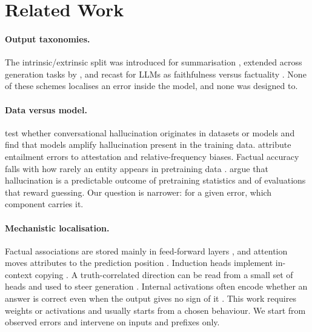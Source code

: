\documentclass[10pt]{article}
\begin{document}
\section{Related Work}
\label{sec:related}

\paragraph{Output taxonomies.} The intrinsic/extrinsic split was introduced for summarisation \citep{maynez2020}, extended across generation tasks by \citet{ji2023}, and recast for LLMs as faithfulness versus factuality \citep{huang2023,alansari2025}. None of these schemes localises an error inside the model, and none was designed to.

\paragraph{Data versus model.} \citet{dziri2022} test whether conversational hallucination originates in datasets or models and find that models amplify hallucination present in the training data. \citet{mckenna2023} attribute entailment errors to attestation and relative-frequency biases. Factual accuracy falls with how rarely an entity appears in pretraining data \citep{kandpal2023,mallen2023}. \citet{kalai2025} argue that hallucination is a predictable outcome of pretraining statistics and of evaluations that reward guessing. Our question is narrower: for a given error, which component carries it.

\paragraph{Mechanistic localisation.} Factual associations are stored mainly in feed-forward layers \citep{geva2021,meng2022}, and attention moves attributes to the prediction position \citep{geva2023}. Induction heads implement in-context copying \citep{olsson2022}. A truth-correlated direction can be read from a small set of heads and used to steer generation \citep{li2023iti}. Internal activations often encode whether an answer is correct even when the output gives no sign of it \citep{kadavath2022,azaria2023,orgad2025,farquhar2024}. This work requires weights or activations and usually starts from a chosen behaviour. We start from observed errors and intervene on inputs and prefixes only.
\end{document}
